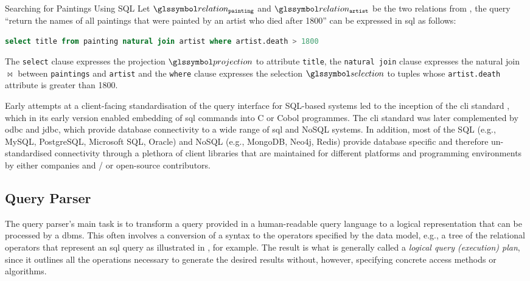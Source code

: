 \begin{example}[label=example:sql_query]{Searching for Paintings Using SQL}{}
    Let  $\relation_{\mathtt{painting}}$ and $\relation_{\mathtt{artist}}$ be the two relations from , the query ``return the names of all paintings that were painted by an artist who died after 1800'' can be expressed in \acrshort{sql} as follows:

    \begin{lstlisting}[language=SQL, showspaces=false, basicstyle=\ttfamily, numbers=none]
        select title from painting natural join artist where artist.death > 1800
    \end{lstlisting}

    The \texttt{select} clause expresses the projection $\projection$ to attribute \texttt{title}, the \texttt{natural join} clause expresses the natural join $\Join$ between \texttt{paintings} and \texttt{artist} and the \texttt{where} clause expresses the selection $\selection$ to tuples whose \texttt{artist.death} attribute is greater than 1800.
\end{example}

Early attempts at a client-facing standardisation of the query interface for SQL-based systems led to the inception of the \acrfull{cli} standard \cite{XOpen:1995CLI}, which in its early version enabled embedding of \acrshort{sql} commands into C or Cobol programmes. The \acrshort{cli} standard was later complemented by \acrfull{odbc} and \acrfull{jdbc}, which provide database connectivity to a wide range of \acrshort{sql} and NoSQL systems. In addition, most of the SQL (e.g., MySQL, PostgreSQL, Microsoft SQL, Oracle) and NoSQL (e.g., MongoDB, Neo4j, Redis) provide database specific and therefore un-standardised connectivity through a plethora of client libraries that are maintained for different platforms and programming environments by either companies and / or open-source contributors.

\subsection{Query Parser}

The query parser's main task is to transform a query provided in a human-readable query language to a logical representation that can be processed by a \acrshort{dbms}. This often involves a conversion of a syntax to the operators specified by the data model, e.g., a tree of the relational operators that represent an \acrshort{sql} query as illustrated in , for example. The result is what is generally called a \emph{logical query (execution) plan}, since it outlines all the operations necessary to generate the desired results without, however, specifying concrete access methods or algorithms.

